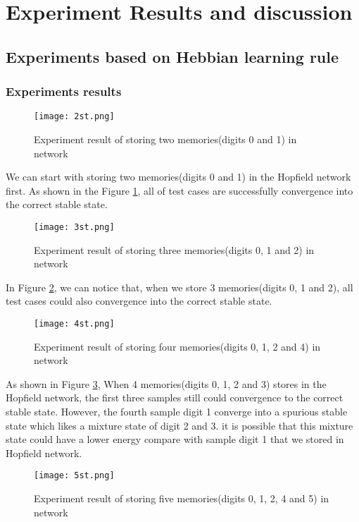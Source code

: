 \section{Experiment Results and discussion}
\subsection{Experiments based on Hebbian learning rule}
\subsubsection{Experiments results}

\begin{figure}[h]
\centering
\texttt{[image: 2st.png]}
\caption{Experiment result of storing two memories(digits 0 and 1) in network}
\label{fg:ex1}
\end{figure}

We can start with storing two memories(digits 0 and 1) in the Hopfield network first. As shown in the Figure \ref{fg:ex1}, all of test cases are successfully convergence into the correct stable state. \\

\begin{figure}[h]
\centering
\texttt{[image: 3st.png]}
\caption{Experiment result of storing three memories(digits 0, 1 and 2) in network}
\label{fg:ex2}
\end{figure}

In Figure \ref{fg:ex2}, we can notice that, when we store 3 memories(digits 0, 1 and 2), all test cases could also convergence into the correct stable state. \\

\begin{figure}[h]
\centering
\texttt{[image: 4st.png]}
\caption{Experiment result of storing four memories(digits 0, 1, 2 and 4) in network}
\label{fg:ex3}
\end{figure}

As shown in Figure \ref{fg:ex3}, When 4 memories(digits 0, 1, 2 and 3) stores in the Hopfield network, the first three samples still could convergence to the correct stable state. However, the fourth sample digit 1 converge into a spurious stable state which likes a mixture state of digit 2 and 3. it is possible that this mixture state could have a lower energy compare with sample digit 1 that we stored in Hopfield network. \\

\begin{figure}[h]
\centering
\texttt{[image: 5st.png]}
\caption{Experiment result of storing five memories(digits 0, 1, 2, 4 and 5) in network}
\label{fg:ex4}
\end{figure}

